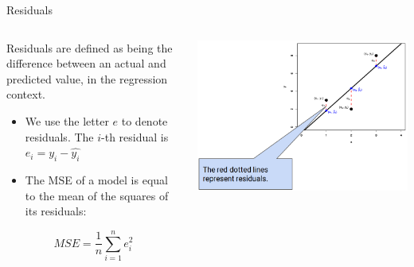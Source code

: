 \documentclass[aspectratio=169]{../latex_main/tntbeamer}  %
\begin{document}
	\begin{frame}{Residuals}
	    \begin{columns}
	        \begin{column}{.4\textwidth}
	        	Residuals are defined as being the difference between an actual and predicted value, in the regression context.
	        	\begin{itemize}
	        	    \item We use the letter $e$ to denote residuals. The $i$-th residual is\\
	        	    $e_i = y_i - \hat{y_i}$
	        	    \item The MSE of a model is equal to the mean of the squares of its residuals:
	        	\end{itemize}
	        	\begin{equation*}
	        	    MSE = \frac{1}{n}\sum\limits_{i=1}^ne_i^2
	        	\end{equation*}
	        \end{column}

	         \begin{column}{.6\textwidth}

                        \vspace{-3em}
	                    \includegraphics[scale=.44]{Bild4}

	        \end{column}
	    \end{columns}
	\end{frame}
	
\end{document}
